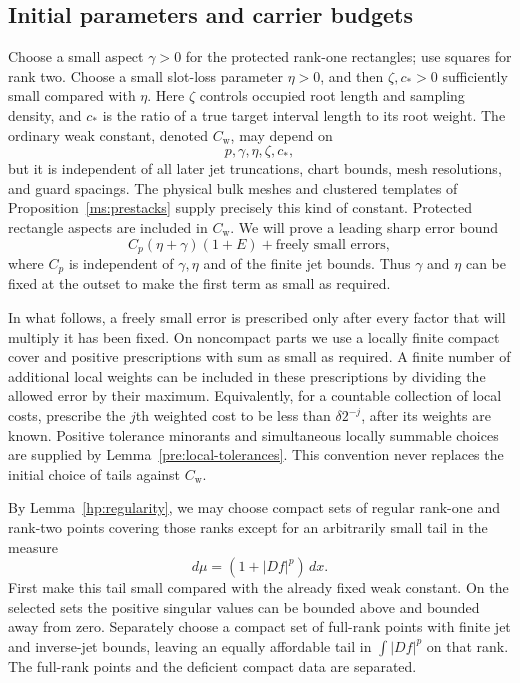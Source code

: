 \subsection{Initial parameters and carrier budgets}
\label{ha:initial}

Choose a small aspect $\gamma>0$ for the protected rank-one rectangles;
use squares for rank two.  Choose a small slot-loss parameter $\eta>0$,
and then $\zeta,c_*>0$ sufficiently small compared with $\eta$.
Here $\zeta$ controls occupied root length and sampling density, and
$c_*$ is the ratio of a true target interval length to its root weight.
The ordinary weak constant, denoted $C_{\mathrm w}$, may depend on
\[
                       p,\gamma,\eta,\zeta,c_* ,
\]
but it is independent of all later jet truncations, chart bounds,
mesh resolutions, and guard spacings.  The physical bulk meshes and
clustered templates of Proposition~\ref{ms:prestacks} supply precisely
this kind of constant.  Protected rectangle aspects are included in
$C_{\mathrm w}$.  We will prove a leading sharp error bound
\begin{equation}\label{ha:leading-error}
 C_p(\eta+\gamma)(1+E)+\text{freely small errors},
\end{equation}
where $C_p$ is independent of $\gamma,\eta$ and of the finite jet
bounds.  Thus $\gamma$ and $\eta$ can be fixed at the outset to make
the first term as small as required.

In what follows, a freely small error is prescribed only after every
factor that will multiply it has been fixed.  On noncompact parts we
use a locally finite compact cover and positive prescriptions with
sum as small as required.  A finite number of additional local weights
can be included in these prescriptions by dividing the allowed error
by their maximum.  Equivalently, for a countable collection of local
costs, prescribe the $j$th weighted cost to be less than
$\delta 2^{-j}$, after its weights are known.  Positive tolerance minorants and simultaneous locally summable
choices are supplied by Lemma~\ref{pre:local-tolerances}.  This
convention never replaces the initial choice of tails against
$C_{\mathrm w}$.

By Lemma~\ref{hp:regularity}, we may choose compact sets of regular
rank-one and rank-two points covering those ranks except for an
arbitrarily small tail in the measure
\[
                         d\mu=(1+|Df|^p)\,dx.
\]
First make this tail small compared with the already fixed weak
constant.  On the selected sets the positive singular values can be
bounded above and bounded away from zero.  Separately choose a compact
set of full-rank points with finite jet and inverse-jet bounds,
leaving an equally affordable tail in $\int |Df|^p$ on that rank.
The full-rank points and the deficient compact data are separated.

